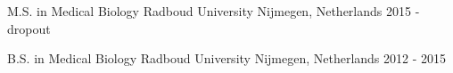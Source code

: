 

\begin{cventries}

\cventry
  {M.S. in Medical Biology} %
  {Radboud University} %
  {Nijmegen, Netherlands} %
  {2015 - dropout} %
  {}


\cventry
  {B.S. in Medical Biology} %
  {Radboud University} %
  {Nijmegen, Netherlands} %
  {2012 - 2015} %
  {}



\end{cventries}